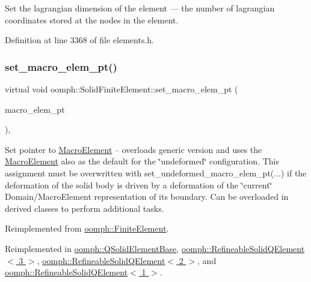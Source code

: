 Set the lagrangian dimension of the element --- the number of lagrangian coordinates stored at the nodes in the element. 



Definition at line 3368 of file elements.\+h.

\mbox{\label{classoomph_1_1SolidFiniteElement_a07ac4c27457c64d9479c64ae8289daaf}} 
\subsubsection{\texorpdfstring{set\+\_\+macro\+\_\+elem\+\_\+pt()}{set\_macro\_elem\_pt()}\hspace{0.1cm}{\footnotesize\ttfamily [1/2]}}
{\footnotesize\ttfamily virtual void oomph\+::\+Solid\+Finite\+Element\+::set\+\_\+macro\+\_\+elem\+\_\+pt (\begin{DoxyParamCaption}\item[{\hyperlink{classoomph_1_1MacroElement}{Macro\+Element} $\ast$}]{macro\+\_\+elem\+\_\+pt }\end{DoxyParamCaption})\hspace{0.3cm}{\ttfamily [inline]}, {\ttfamily [virtual]}}



Set pointer to \hyperlink{classoomph_1_1MacroElement}{Macro\+Element} -- overloads generic version and uses the \hyperlink{classoomph_1_1MacroElement}{Macro\+Element} also as the default for the \char`\"{}undeformed\char`\"{} configuration. This assignment must be overwritten with set\+\_\+undeformed\+\_\+macro\+\_\+elem\+\_\+pt(...) if the deformation of the solid body is driven by a deformation of the \char`\"{}current\char`\"{} Domain/\+Macro\+Element representation of it\textquotesingle{}s boundary. Can be overloaded in derived classes to perform additional tasks. 



Reimplemented from \hyperlink{classoomph_1_1FiniteElement_a170b030b8365ebbab5287f0a420cc8c8}{oomph\+::\+Finite\+Element}.



Reimplemented in \hyperlink{classoomph_1_1QSolidElementBase_a0ceca47c039bbb38b0feb3baa330a27f}{oomph\+::\+Q\+Solid\+Element\+Base}, \hyperlink{classoomph_1_1RefineableSolidQElement_3_013_01_4_a2b1aa7874048e0f38370ae7bf761d315}{oomph\+::\+Refineable\+Solid\+Q\+Element$<$ 3 $>$}, \hyperlink{classoomph_1_1RefineableSolidQElement_3_012_01_4_aac8a230631c509dd854d71a5f68b6483}{oomph\+::\+Refineable\+Solid\+Q\+Element$<$ 2 $>$}, and \hyperlink{classoomph_1_1RefineableSolidQElement_3_011_01_4_ae0cd264bee16dd1d05d35f79e33dd408}{oomph\+::\+Refineable\+Solid\+Q\+Element$<$ 1 $>$}.



